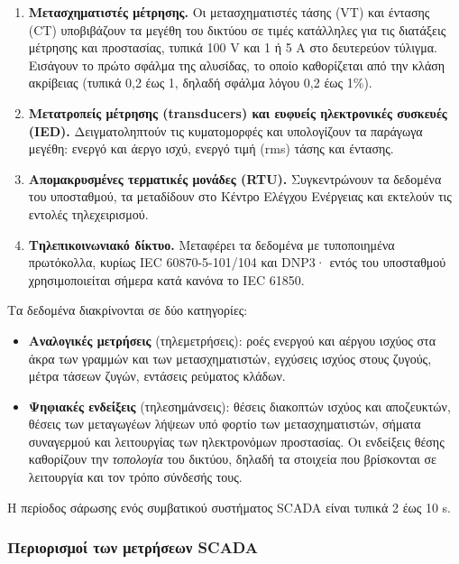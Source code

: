 \begin{enumerate}
\item \textbf{Μετασχηματιστές μέτρησης.} Οι μετασχηματιστές τάσης (VT) και έντασης (CT)
      υποβιβάζουν τα μεγέθη του δικτύου σε τιμές κατάλληλες για τις διατάξεις μέτρησης
      και προστασίας, τυπικά 100 V και 1 ή 5 A στο δευτερεύον τύλιγμα. Εισάγουν το πρώτο
      σφάλμα της αλυσίδας, το οποίο καθορίζεται από την κλάση ακρίβειας (τυπικά 0,2 έως 1,
      δηλαδή σφάλμα λόγου 0,2 έως 1\%).
\item \textbf{Μετατροπείς μέτρησης (transducers) και ευφυείς ηλεκτρονικές συσκευές (IED).}
      Δειγματοληπτούν τις κυματομορφές και υπολογίζουν τα παράγωγα μεγέθη: ενεργό και
      άεργο ισχύ, ενεργό τιμή (rms) τάσης και έντασης.
\item \textbf{Απομακρυσμένες τερματικές μονάδες (RTU).} Συγκεντρώνουν τα δεδομένα του
      υποσταθμού, τα μεταδίδουν στο Κέντρο Ελέγχου Ενέργειας και εκτελούν τις εντολές
      τηλεχειρισμού.
\item \textbf{Τηλεπικοινωνιακό δίκτυο.} Μεταφέρει τα δεδομένα με τυποποιημένα πρωτόκολλα,
      κυρίως IEC 60870-5-101/104 και DNP3· εντός του υποσταθμού χρησιμοποιείται σήμερα
      κατά κανόνα το IEC 61850.
\end{enumerate}

Τα δεδομένα διακρίνονται σε δύο κατηγορίες:

\begin{itemize}
\item \textbf{Αναλογικές μετρήσεις} (τηλεμετρήσεις): ροές ενεργού και αέργου ισχύος στα
      άκρα των γραμμών και των μετασχηματιστών, εγχύσεις ισχύος στους ζυγούς, μέτρα τάσεων
      ζυγών, εντάσεις ρεύματος κλάδων.
\item \textbf{Ψηφιακές ενδείξεις} (τηλεσημάνσεις): θέσεις διακοπτών ισχύος και αποζευκτών,
      θέσεις των μεταγωγέων λήψεων υπό φορτίο των μετασχηματιστών, σήματα συναγερμού και
      λειτουργίας των ηλεκτρονόμων προστασίας. Οι ενδείξεις θέσης καθορίζουν την
      \emph{τοπολογία} του δικτύου, δηλαδή τα στοιχεία που βρίσκονται σε λειτουργία και τον
      τρόπο σύνδεσής τους.
\end{itemize}

Η περίοδος σάρωσης ενός συμβατικού συστήματος SCADA είναι τυπικά 2 έως 10 s.

\subsubsection*{Περιορισμοί των μετρήσεων SCADA}

